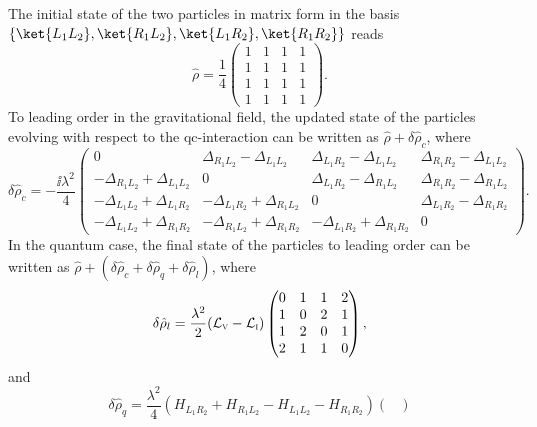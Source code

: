 {The initial state of the two particles in matrix form in the basis $\{\ket{L_1L_2},\ket{R_1 L_2},\ket{L_1R_2},\ket{R_1R_2}\}$ reads
\begin{equation}
    \hat{\rho} = \frac{1}{4}
    \begin{pmatrix}
        1 & 1 & 1 & 1\\
        1 & 1 & 1 & 1\\
        1 & 1 & 1 & 1\\
        1 & 1 & 1 & 1        
    \end{pmatrix}.
\end{equation}
To leading order in the gravitational field, the updated state of the particles evolving with respect to the qc-interaction can be written as $\hat{\rho} +  \delta\hat{\rho}_c$, where
\begin{equation}
    \delta\hat{\rho}_c = -\frac{\ii \lambda^2}{4}
    \begin{pmatrix}
        0 & \Delta_{R_1L_2}-\Delta_{L_1L_2} &\Delta_{L_1R_2}-\Delta_{L_1L_2} & \Delta_{R_1R_2}-\Delta_{L_1L_2}\\
        -\Delta_{R_1L_2}+\Delta_{L_1L_2} & 0 & \Delta_{L_1R_2}-\Delta_{R_1L_2} & \Delta_{R_1R_2}-\Delta_{R_1L_2}\\
       -\Delta_{L_1L_2}+\Delta_{L_1R_2} & -\Delta_{L_1R_2}+\Delta_{R_1L_2} & 0 & \Delta_{L_1R_2}-\Delta_{R_1R_2}\\
        -\Delta_{L_1L_2}+\Delta_{R_1R_2} & -\Delta_{R_1L_2}+\Delta_{R_1R_2} & -\Delta_{L_1R_2}+\Delta_{R_1R_2} & 0      
    \end{pmatrix}.
\end{equation}
In the quantum case, the final state of the particles to leading order can be written as $\hat{\rho} + (\delta\hat{\rho}_c+\delta\hat{\rho}_q+\delta \hat{\rho}_l)$, where
\begin{equation}
    \delta\hat{\rho}_l = \frac{\lambda^2}{2} (\mathcal{L}_\textsc{v}-\mathcal{L}_{\textsc{i}})
    \begin{pmatrix}
        0  &  1 & 1 & 2\\
        1  &  0 & 2 & 1\\
        1  &  2 & 0 & 1\\
        2  &  1 & 1 & 0
    \end{pmatrix},
\end{equation}
and
\begin{equation}
    \delta\hat{\rho}_q = \frac{\lambda^2}{4}(H_{L_1R_2} \!\!+ \!\!H_{R_1L_2} \!\!-\!\! H_{L_1L_2}\!\!-\!\!H_{R_1R_2})
    \begin{pmatrix}

\end{pmatrix}
\end{equation}}
